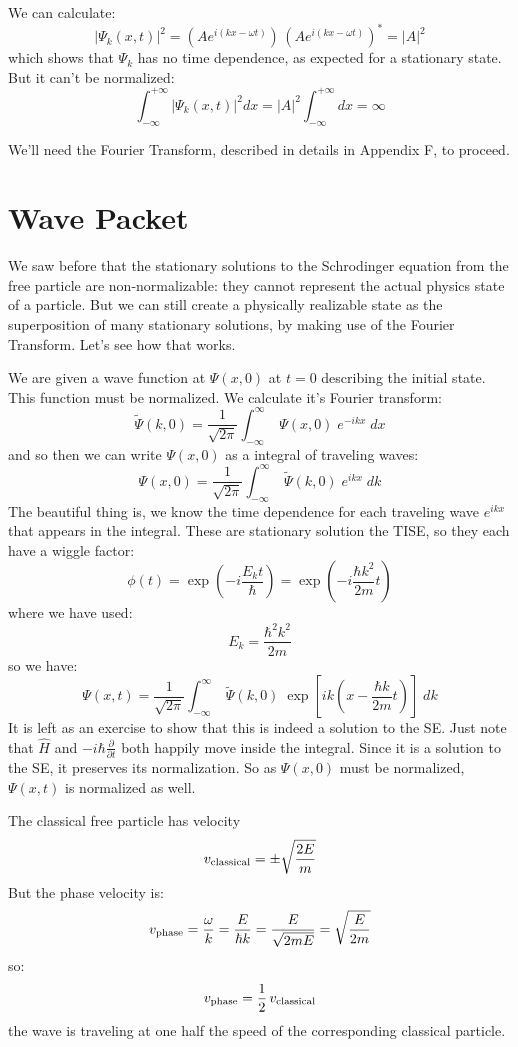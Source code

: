 \documentclass[12pt]{book}
\begin{document}
We can calculate:
$$|\Psi_k(x,t)|^2 = \left( A e^{i (k x-\omega t)} \right) \, \left( A e^{i (k x-\omega t)} \right)^*
= |A|^2$$ 
which shows that $\Psi_k$ has no time dependence, as expected for a stationary state.  But it can't be normalized:
$$\int_{-\infty}^{+\infty} |\Psi_k(x,t)|^2 dx = |A|^2 \int_{-\infty}^{+\infty} dx = \infty$$

We'll need the Fourier Transform, described in details in Appendix F, to proceed.

\section{Wave Packet}

We saw before that the stationary solutions to the Schrodinger
equation from the free particle are non-normalizable: they cannot
represent the actual physics state of a particle.  But we can still
create a physically realizable state as the superposition of many
stationary solutions, by making use of the Fourier Transform.  Let's
see how that works.

We are given a wave function at $\Psi(x,0)$ at $t=0$ describing the
initial state.  This function must be normalized.  We calculate it's
Fourier transform:
$$ \widetilde{\Psi}(k,0) = \frac{1}{\sqrt{2\pi}} \int_{-\infty}^{\infty} \; \Psi(x,0) \; e^{-ikx} \; dx $$
and so then we can write $\Psi(x,0)$ as a integral of traveling waves:
$$ \Psi(x,0) = \frac{1}{\sqrt{2\pi}} \int_{-\infty}^{\infty} \; \widetilde{\Psi}(k,0) \; e^{ikx} \; dk $$
The beautiful thing is, we know the time dependence for each traveling wave $e^{ikx}$ that appears in the integral.  These are stationary solution the TISE, so they each have a wiggle factor:
$$\phi(t) = \exp\left(-i\frac{E_k t}{\hbar}\right) = \exp\left(-i\frac{\hbar k^2}{2m}t\right)$$
where we have used:
$$E_k = \frac{\hbar^2 k^2}{2m}$$
so we have:
$$ \Psi(x,t) = \frac{1}{\sqrt{2\pi}} \int_{-\infty}^{\infty} \; \widetilde{\Psi}(k,0) \; 
\exp\left[ik\left(x-\frac{\hbar k}{2m}t\right)\right]\; dk $$
It is left as an exercise to show that this is indeed a solution to the SE.  Just note that $\hat{H}$
and $-i\hbar \frac{\partial}{\partial t}$ both happily move inside the integral.  Since it is a solution to the SE, it preserves its normalization. So as $\Psi(x,0)$ must be normalized, $\Psi(x,t)$ is normalized as well.

The classical free particle has velocity
$$v_{\rm classical} = \pm\sqrt{\frac{2E}{m}}$$
But the phase velocity is:
$$v_{\rm phase} = \frac{\omega}{k} = \frac{E}{\hbar k} = \frac{E}{\sqrt{2mE}} = \sqrt{\frac{E}{2m}}$$
so:
$$v_{\rm phase} = \frac{1}{2} \, v_{\rm classical} $$
the wave is traveling at one half the speed of the corresponding classical particle.
\end{document}
